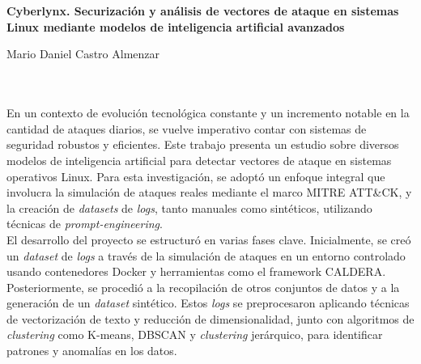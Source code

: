 \chapter*{}




\cleardoublepage
\thispagestyle{empty}

\begin{center}
{\large\bfseries Cyberlynx. Securización y análisis de vectores de ataque en sistemas Linux mediante modelos de inteligencia artificial avanzados}\\
\end{center}
\begin{center}
Mario Daniel Castro Almenzar\\
\end{center}

\\

\vspace{0.7cm}
\\

En un contexto de evolución tecnológica constante y un incremento notable en la cantidad de ataques diarios, se vuelve imperativo contar con sistemas de seguridad robustos y eficientes. Este trabajo presenta un estudio sobre diversos modelos de inteligencia artificial para detectar vectores de ataque en sistemas operativos Linux. Para esta investigación, se adoptó un enfoque integral que involucra la simulación de ataques reales mediante el marco MITRE \gls{ATT&CK}, y la creación de \textit{datasets} de \textit{logs}, tanto manuales como sintéticos, utilizando técnicas de \textit{prompt-engineering}. \\

El desarrollo del proyecto se estructuró en varias fases clave. Inicialmente, se creó un \textit{dataset} de \textit{logs} a través de la simulación de ataques en un entorno controlado usando contenedores Docker y herramientas como el framework \gls{CALDERA}. Posteriormente, se procedió a la recopilación de otros conjuntos de datos y a la generación de un \textit{dataset} sintético. Estos \textit{logs} se preprocesaron aplicando técnicas de vectorización de texto y reducción de dimensionalidad, junto con algoritmos de \textit{clustering} como K-means, DBSCAN y \textit{clustering} jerárquico, para identificar patrones y anomalías en los datos. \\

